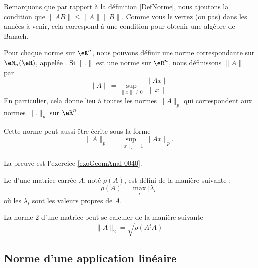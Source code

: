 Remarquons que par rapport à la définition \ref{DefNorme}, nous ajoutons la condition que \( \| AB \|\leq \| A \|\| B \|\). Comme vous le verrez (ou pas) dans les années à venir, cela correspond à une condition pour obtenir une algèbre de Banach.

\begin{example}     \label{ExemdefnormpMrt}
    Pour chaque norme sur \( \eR^n\), nous pouvons définir une norme correspondante sur \( \eM_n(\eR)\), appelée . Si \( \| . \|\) est une norme sur \( \eR^n\), nous définissons \( \| A \|\) par
    \begin{equation}
        \|A\|=\sup_{\|x\|\neq 0}\frac{\|Ax\|}{\|x\|}
    \end{equation}
    En particulier, cela donne lieu à toutes les normes \( \| A \|_p\) qui correspondent aux normes \( \| . \|_p\) sur \( \eR^n\).
\end{example}

\begin{lemma}
    Cette norme peut aussi être écrite sous la forme
    \begin{equation}
        \| A \|_p=\sup_{\|x\|_p=1}\|Ax\|_p.
    \end{equation}
\end{lemma}

La preuve est l'exercice \ref{exoGeomAnal-0040}.


\begin{definition}
    Le  d'une matrice carrée $A$, noté $\rho(A)$, est défini de la manière suivante :
    \begin{equation}
        \rho(A)=\max_i|\lambda_i|
    \end{equation}
    où les $\lambda_i$ sont les valeurs propres de $A$.
\end{definition}

\begin{theorem}
    La norme $2$ d'une matrice peut se calculer de la manière suivante $$\|A\|_2=\sqrt{\rho(A{^t}A)}$$
\end{theorem}

\subsection{Norme d'une application linéaire}
\label{subsecNomrApplLin}

